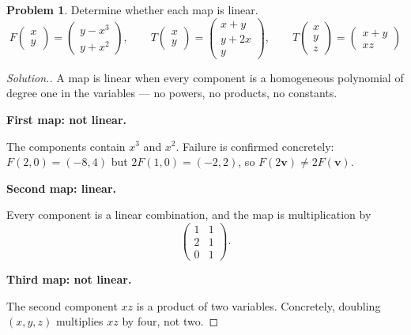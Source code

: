 \documentclass[11pt,a4paper]{article}
\theoremstyle{definition}
\newtheorem{problemx}{Problem}[subsection]
\newenvironment{problem}{\begin{problemx}}{\end{problemx}}
\newenvironment{solution}
  {\renewcommand{\qedsymbol}{}\begin{proof}[\textit{Solution}.]}
  {\end{proof}}
\newcommand{\subhead}[1]{%
  \par\medskip\noindent\textbf{#1}\par\nobreak\smallskip}
\begin{document}
\begin{problem}
Determine whether each map is linear.
\[F\begin{pmatrix}x\\y\end{pmatrix} = \begin{pmatrix}y-x^3\\ y+x^2\end{pmatrix},
\qquad
T\begin{pmatrix}x\\y\end{pmatrix} = \begin{pmatrix}x+y\\ y+2x\\ y\end{pmatrix},
\qquad
T\begin{pmatrix}x\\y\\z\end{pmatrix} = \begin{pmatrix}x+y\\ xz\end{pmatrix}\]
\end{problem}
\begin{solution}
A map is linear when every component is a homogeneous polynomial of degree one
in the variables --- no powers, no products, no constants.

\subhead{First map: not linear.} The components contain $x^3$ and $x^2$. Failure
is confirmed concretely: $F(2,0) = (-8,4)$ but $2F(1,0) = (-2,2)$, so
$F(2\mathbf{v})\neq 2F(\mathbf{v})$.

\subhead{Second map: linear.} Every component is a linear combination, and the
map is multiplication by
\[\begin{pmatrix}1 & 1\\ 2 & 1\\ 0 & 1\end{pmatrix}.\]

\subhead{Third map: not linear.} The second component $xz$ is a product of two
variables. Concretely, doubling $(x,y,z)$ multiplies $xz$ by four, not two.
\end{solution}
\end{document}
